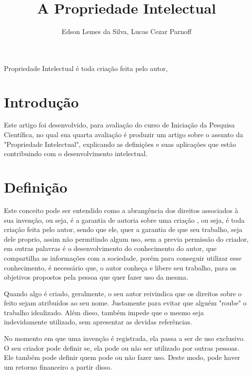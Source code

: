 \documentclass[12pt]{article}
\title{A Propriedade Intelectual}
\author{Edson Lemes da Silva\inst{1}, Lucas Cezar Parnoff\inst{1}  }
\begin{document}
 

\maketitle

\begin{abstract}
  
\end{abstract}
     
\begin{resumo} 
  Propriedade Intelectual é toda criação feita pelo autor, 
\end{resumo}

\section{Introdução}\label{sec:introducao}

Este artigo foi desenvolvido, para avaliação
do curso de Iniciação da Pesquisa Científica, no qual
sua quarta avaliação é produzir um artigo sobre o assunto da
"Propriedade Intelectual", explicando as definições e
suas aplicações que estão contribuindo com
o desenvolvimento intelectual.

\section{Definição}\label{sec:conteudo}

Este conceito pode ser entendido como a abrangência  dos direitos associados à sua invenção, ou seja, é a garantia de autoria sobre uma criação \cite{UFAL}, ou seja, é toda criação feita pelo autor, sendo que ele, quer a garantia de que seu trabalho, seja dele proprio, assim não permitindo algum uso, sem a previa permissão do criador, em outras palavras é o desenvolvimento do conhecimento do autor, que compartilha as informações com a sociedade, porém para conseguir utilizar esse conhecimento, é necessário que, o autor conheça e libere seu trabalho, para os objetivos propostos pela pessoa que quer fazer uso da mesma. 

Quando algo é criado, geralmente, o seu autor reivindica que os direitos sobre o feito sejam atribuídos ao seu nome. Justamente para evitar que alguém "roube" o trabalho idealizado. Além disso, também impede que o mesmo seja indevidamente utilizado, sem apresentar as devidas referências.

No momento em que uma invenção é registrada, ela passa a ser de uso exclusivo. O seu criador pode definir se, ela pode ou não ser utilizado por outras pessoas. Ele também pode definir quem pode ou não fazer uso. Deste modo, pode haver um retorno financeiro a partir disso.
\end{document}
